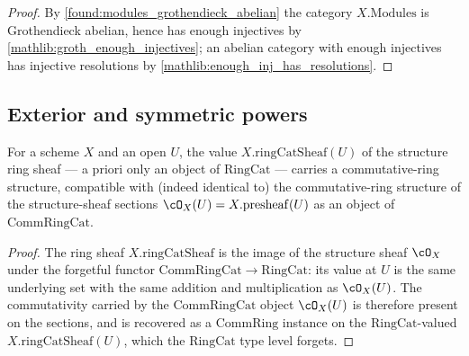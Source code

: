 \begin{proof}
  \leanok
  By \cref{found:modules_grothendieck_abelian} the category \(X.\mathrm{Modules}\)
  is Grothendieck abelian, hence has enough injectives by
  \cref{mathlib:groth_enough_injectives}; an abelian category with enough
  injectives has injective resolutions by
  \cref{mathlib:enough_inj_has_resolutions}.
\end{proof}

\subsection{Exterior and symmetric powers}

\begin{lemma}
  \label{found:ringcatsheaf_commring}
  For a scheme \(X\) and an open \(U\), the value \(X.\mathrm{ringCatSheaf}(U)\) of
  the structure ring sheaf --- a priori only an object of \(\mathrm{RingCat}\) ---
  carries a commutative-ring structure, compatible with (indeed identical to) the
  commutative-ring structure of the structure-sheaf sections \(\cO_X(U)=
  X.\mathrm{presheaf}(U)\) as an object of \(\mathrm{CommRingCat}\).
\end{lemma}

\begin{proof}
  \leanok
  The ring sheaf \(X.\mathrm{ringCatSheaf}\) is the image of the structure sheaf
  \(\cO_X\) under the forgetful functor \(\mathrm{CommRingCat}\to\mathrm{RingCat}\):
  its value at \(U\) is the same underlying set with the same addition and
  multiplication as \(\cO_X(U)\).  The commutativity carried by the
  \(\mathrm{CommRingCat}\) object \(\cO_X(U)\) is therefore present on the
  sections, and is recovered as a \(\mathrm{CommRing}\) instance on the
  \(\mathrm{RingCat}\)-valued \(X.\mathrm{ringCatSheaf}(U)\), which the
  \(\mathrm{RingCat}\) type level forgets.
\end{proof}

